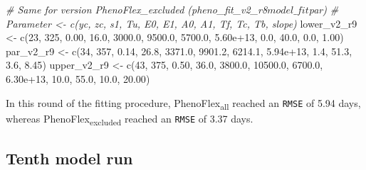 \documentclass[
]{article}
\newenvironment{Shaded}{\begin{snugshade}}{\end{snugshade}}
\newcommand{\CommentTok}[1]{\textcolor[rgb]{0.56,0.35,0.01}{\textit{#1}}}
\newcommand{\DecValTok}[1]{\textcolor[rgb]{0.00,0.00,0.81}{#1}}
\newcommand{\FloatTok}[1]{\textcolor[rgb]{0.00,0.00,0.81}{#1}}
\newcommand{\FunctionTok}[1]{\textcolor[rgb]{0.00,0.00,0.00}{#1}}
\newcommand{\NormalTok}[1]{#1}
\newcommand{\OtherTok}[1]{\textcolor[rgb]{0.56,0.35,0.01}{#1}}
\begin{document}
\begin{Shaded}
\begin{Highlighting}[]
\CommentTok{\# Same for version PhenoFlex\_excluded (pheno\_fit\_v2\_r8$model\_fit$par)}
\CommentTok{\# Parameter \textless{}{-} c(yc,  zc,   s1,   Tu,     E0,      E1,     A0,       A1,   Tf,   Tc,   Tb, slope)}
\NormalTok{lower\_v2\_r9 }\OtherTok{\textless{}{-}} \FunctionTok{c}\NormalTok{(}\DecValTok{23}\NormalTok{, }\DecValTok{325}\NormalTok{, }\FloatTok{0.00}\NormalTok{, }\FloatTok{16.0}\NormalTok{, }\FloatTok{3000.0}\NormalTok{,  }\FloatTok{9500.0}\NormalTok{, }\FloatTok{5700.0}\NormalTok{, }\FloatTok{5.60e+13}\NormalTok{,  }\FloatTok{0.0}\NormalTok{, }\FloatTok{40.0}\NormalTok{,  }\FloatTok{0.0}\NormalTok{,  }\FloatTok{1.00}\NormalTok{)}
\NormalTok{par\_v2\_r9   }\OtherTok{\textless{}{-}} \FunctionTok{c}\NormalTok{(}\DecValTok{34}\NormalTok{, }\DecValTok{357}\NormalTok{, }\FloatTok{0.14}\NormalTok{, }\FloatTok{26.8}\NormalTok{, }\FloatTok{3371.0}\NormalTok{,  }\FloatTok{9901.2}\NormalTok{, }\FloatTok{6214.1}\NormalTok{, }\FloatTok{5.94e+13}\NormalTok{,  }\FloatTok{1.4}\NormalTok{, }\FloatTok{51.3}\NormalTok{,  }\FloatTok{3.6}\NormalTok{,  }\FloatTok{8.45}\NormalTok{)}
\NormalTok{upper\_v2\_r9 }\OtherTok{\textless{}{-}} \FunctionTok{c}\NormalTok{(}\DecValTok{43}\NormalTok{, }\DecValTok{375}\NormalTok{, }\FloatTok{0.50}\NormalTok{, }\FloatTok{36.0}\NormalTok{, }\FloatTok{3800.0}\NormalTok{, }\FloatTok{10500.0}\NormalTok{, }\FloatTok{6700.0}\NormalTok{, }\FloatTok{6.30e+13}\NormalTok{, }\FloatTok{10.0}\NormalTok{, }\FloatTok{55.0}\NormalTok{, }\FloatTok{10.0}\NormalTok{, }\FloatTok{20.00}\NormalTok{)}
\end{Highlighting}
\end{Shaded}

In this round of the fitting procedure, PhenoFlex\textsubscript{all}
reached an \texttt{RMSE} of 5.94 days, whereas
PhenoFlex\textsubscript{excluded} reached an \texttt{RMSE} of 3.37 days.

\hypertarget{tenth-model-run}{%
\subsection{Tenth model run}\label{tenth-model-run}}
\end{document}
